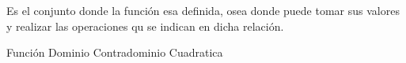 
\question Es el conjunto donde la función esa definida, osea donde puede
tomar sus valores y realizar las operaciones qu se indican en  dicha
relación.


  \begin{oneparchoices}
    \choice Función
    \choice Dominio
    \choice Contradominio
    \choice Cuadratica
  \end{oneparchoices}
